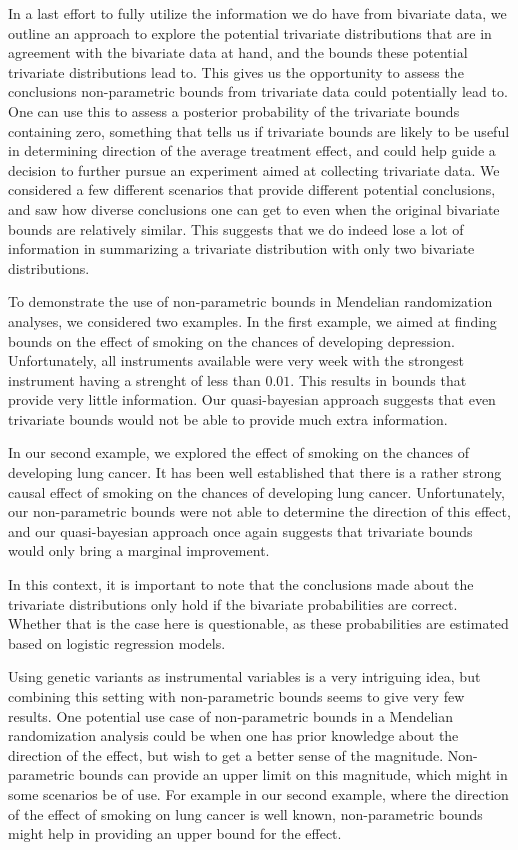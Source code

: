 \documentclass[
]{article}
\theoremstyle{plain}
\begin{document}
In a last effort to fully utilize the information we do have from bivariate data, we outline an approach to explore the potential trivariate distributions that are in agreement with the bivariate data at hand, and the bounds these potential trivariate distributions lead to. This gives us the opportunity to assess the conclusions non-parametric bounds from trivariate data could potentially lead to. One can use this to assess a posterior probability of the trivariate bounds containing zero, something that tells us if trivariate bounds are likely to be useful in determining direction of the average treatment effect, and could help guide a decision to further pursue an experiment aimed at collecting trivariate data. We considered a few different scenarios that provide different potential conclusions, and saw how diverse conclusions one can get to even when the original bivariate bounds are relatively similar. This suggests that we do indeed lose a lot of information in summarizing a trivariate distribution with only two bivariate distributions.

To demonstrate the use of non-parametric bounds in Mendelian randomization analyses, we considered two examples. In the first example, we aimed at finding bounds on the effect of smoking on the chances of developing depression. Unfortunately, all instruments available were very week with the strongest instrument having a strenght of less than \(0.01\). This results in bounds that provide very little information. Our quasi-bayesian approach suggests that even trivariate bounds would not be able to provide much extra information.

In our second example, we explored the effect of smoking on the chances of developing lung cancer. It has been well established that there is a rather strong causal effect of smoking on the chances of developing lung cancer. Unfortunately, our non-parametric bounds were not able to determine the direction of this effect, and our quasi-bayesian approach once again suggests that trivariate bounds would only bring a marginal improvement.

In this context, it is important to note that the conclusions made about the trivariate distributions only hold if the bivariate probabilities are correct. Whether that is the case here is questionable, as these probabilities are estimated based on logistic regression models.

Using genetic variants as instrumental variables is a very intriguing idea, but combining this setting with non-parametric bounds seems to give very few results. One potential use case of non-parametric bounds in a Mendelian randomization analysis could be when one has prior knowledge about the direction of the effect, but wish to get a better sense of the magnitude. Non-parametric bounds can provide an upper limit on this magnitude, which might in some scenarios be of use. For example in our second example, where the direction of the effect of smoking on lung cancer is well known, non-parametric bounds might help in providing an upper bound for the effect.
\end{document}
